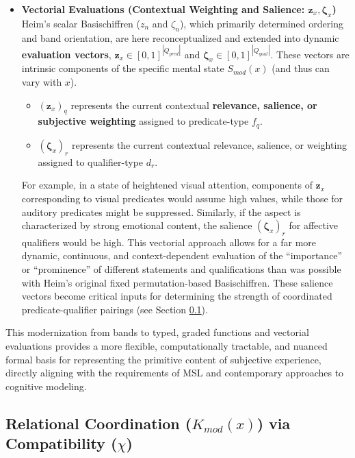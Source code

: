 \documentclass[
    12pt,              %
    a4paper,           %
    headings=normal,   %
    twoside=true,      %
    BCOR=8mm,          %
]{scrbook}
\newcommand{\q}[1]{\enquote{#1}}
\begin{document}
\begin{itemize}
    \item   \textbf{Vectorial Evaluations (Contextual Weighting and Salience: \(\mathbf{z}_x, \mathbf{\zeta}_x\))}
        Heim's scalar Basischiffren (\(z_n\) and \(\zeta_n\)), which primarily determined ordering and band orientation, are here reconceptualized and extended into dynamic \textbf{evaluation vectors}, \(\mathbf{z}_x \in [0,1]^{|Q_{pred}|}\) and \(\mathbf{\zeta}_x \in [0,1]^{|Q_{qual}|}\). These vectors are intrinsic components of the specific mental state \(S_{mod}(x)\) (and thus can vary with \(x\)).
        \begin{itemize}
            \item   \((\mathbf{z}_x)_q\) represents the current contextual \textbf{relevance, salience, or subjective weighting} assigned to predicate-type \(f_q\).
            \item   \((\mathbf{\zeta}_x)_r\) represents the current contextual relevance, salience, or weighting assigned to qualifier-type \(d_r\).
        \end{itemize}
        For example, in a state of heightened visual attention, components of \(\mathbf{z}_x\) corresponding to visual predicates would assume high values, while those for auditory predicates might be suppressed. Similarly, if the aspect is characterized by strong emotional content, the salience \((\mathbf{\zeta}_x)_r\) for affective qualifiers would be high. This vectorial approach allows for a far more dynamic, continuous, and context-dependent evaluation of the \q{importance} or \q{prominence} of different statements and qualifications than was possible with Heim's original fixed permutation-based Basischiffren. These salience vectors become critical inputs for determining the strength of coordinated predicate-qualifier pairings (see Section \ref{sec:ch1_relational_coordination}).
\end{itemize}
This modernization from bands to typed, graded functions and vectorial evaluations provides a more flexible, computationally tractable, and nuanced formal basis for representing the primitive content of subjective experience, directly aligning with the requirements of MSL and contemporary approaches to cognitive modeling.

\subsection{Relational Coordination (\(K_{mod}(x)\)) via Compatibility (\(\chi\))}
\label{sec:ch1_relational_coordination} 
\end{document}

